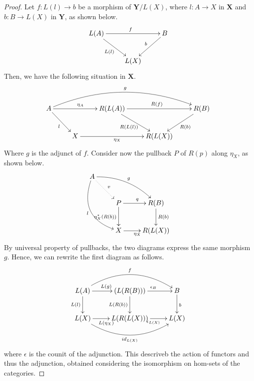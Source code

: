 \documentclass[a4paper,UKenglish,cleveref,pdftex,thm-restate,numberwithinsect]{lipics-v2021}
\newcommand{\cat}[1]{\ensuremath{\mathbf{#1}}}
\newcommand{\id}[1]{\mathsf{id}_{#1}}
\begin{document}
\begin{proof}
	Let $f: L(l) \to b$ be a morphism of $\cat Y/L(X)$, where $l: A \to X$ in $\cat X$ and $b: B \to L(X)$ in $\cat Y$, as shown below.
	\[\xymatrix{L(A)\ar[rr]^{f}\ar[dr]_{L(l)}&&B\ar[dl]_{b}\\&L(X)}\]
	Then, we have the following situation in $\cat X$.
	\[\xymatrix{
			A \ar[rr]^{\eta_A}\ar[dr]_{l} \ar@/^2.0pc/@[black][rrrr]^{g} && R(L(A)) \ar[rr]^{R(f)} \ar[dr]_{R(L(l))} && R(B) \ar[dl]^{R(b)}\\
						      & X \ar[rr]_{\eta_X} && R(L(X))
	}\]
	Where $g$ is the adjunct of $f$.
	Consider now the pullback $P$ of $R(p)$ along $\eta_X$, as shown below.
	\[\xymatrix{
		A \ar@/^1.0pc/[drr]^{g}\ar@/_2.0pc/[ddr]_{l} \ar@{.>}[dr]^{v}\\&P\ar[r]^{q}\ar[d]_{\eta_X^*(R(b))}&R(B)\ar[d]^{R(b)}\\&X \ar[r]_{\eta_X}&R(L(X))
	}\]
	By universal property of pullbacks, the two diagrams express the same morphism $g$.
	Hence, we can rewrite the first diagram as follows.
	\[\xymatrix{
			L(A)\ar[r]^{L(g)}\ar[d]_{L(l)}\ar@/^2.0pc/[rr]^{f}&(L(R(B)))\ar[d]_{L(R(b))}\ar[r]^{\epsilon_B}&B\ar[d]^{b}\\
			L(X)\ar[r]_{L(\eta_X)}\ar@/_2.0pc/[rr]_{\id{L(X)}}&L(R(L(X)))\ar[r]_{\epsilon_{L(X)}}& L(X)
	}\]
	where $\epsilon$ is the counit of the adjunction.
	This descriveb the action of functors and thus the adjunction, obtained considering the isomorphism on hom-sets of the categories.

\end{proof}
\fi

\end{document}

